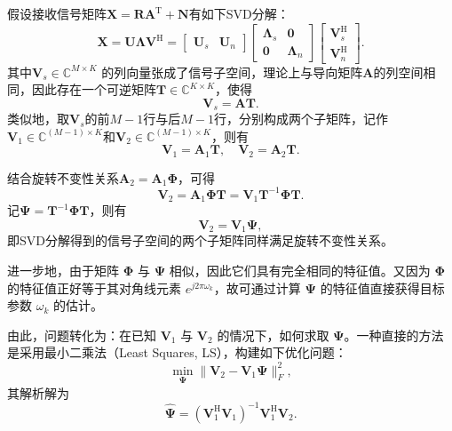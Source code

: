 假设接收信号矩阵\( \mathbf{X} = \mathbf{R} \mathbf{A}^{\mathrm{T}} + \mathbf{N} \)有如下SVD分解：
\[
    \mathbf{X} = \mathbf{U} \mathbf{\Lambda} \mathbf{V}^{\mathrm{H}} = \begin{bmatrix}
        \mathbf{U}_s & \mathbf{U}_n
    \end{bmatrix} \begin{bmatrix}
        \mathbf{\Lambda}_s & \mathbf{0}         \\
        \mathbf{0}         & \mathbf{\Lambda}_n
    \end{bmatrix} \begin{bmatrix}
        \mathbf{V}_s^{\mathrm{H}} \\
        \mathbf{V}_n^{\mathrm{H}}
    \end{bmatrix}.
\]
其中\( \mathbf{V}_s \in \mathbb{C}^{M \times K} \) 的列向量张成了信号子空间，理论上与导向矩阵\( \mathbf{A} \)的列空间相同，因此存在一个可逆矩阵\( \mathbf{T} \in \mathbb{C}^{K \times K} \)，使得
\[
    \mathbf{V}_s = \mathbf{A} \mathbf{T}.
\]
类似地，取\( \mathbf{V}_s \)的前\( M-1 \)行与后\( M-1 \)行，分别构成两个子矩阵，记作\( \mathbf{V}_1 \in \mathbb{C}^{(M-1) \times K} \)和\( \mathbf{V}_2 \in \mathbb{C}^{(M-1) \times K} \)，则有
\[
    \mathbf{V}_1 = \mathbf{A}_1 \mathbf{T}, \quad \mathbf{V}_2 = \mathbf{A}_2 \mathbf{T}.
\]

结合旋转不变性关系\( \mathbf{A}_2 = \mathbf{A}_1 \mathbf{\Phi} \)，可得
\[
    \mathbf{V}_2 = \mathbf{A}_1 \mathbf{\Phi} \mathbf{T} = \mathbf{V}_1 \mathbf{T}^{-1} \mathbf{\Phi} \mathbf{T}.
\]
记\( \mathbf{\Psi} = \mathbf{T}^{-1} \mathbf{\Phi} \mathbf{T} \)，则有
\[
    \mathbf{V}_2 = \mathbf{V}_1 \mathbf{\Psi},
\]
即SVD分解得到的信号子空间的两个子矩阵同样满足旋转不变性关系。

进一步地，由于矩阵 \( \mathbf{\Phi} \) 与 \( \mathbf{\Psi} \) 相似，因此它们具有完全相同的特征值。又因为 \( \mathbf{\Phi} \) 的特征值正好等于其对角线元素 \( e^{j2\pi\omega_k} \)，故可通过计算 \( \mathbf{\Psi} \) 的特征值直接获得目标参数 \( \omega_k \) 的估计。

由此，问题转化为：在已知 \( \mathbf{V}_1 \) 与 \( \mathbf{V}_2 \) 的情况下，如何求取 \( \mathbf{\Psi} \)。一种直接的方法是采用最小二乘法（Least Squares, LS），构建如下优化问题：
\[
    \min_{\mathbf{\Psi}} \|\mathbf{V}_2 - \mathbf{V}_1 \mathbf{\Psi}\|_F^2,
\]
其解析解为
\[
    \hat{\mathbf{\Psi}} = (\mathbf{V}_1^{\mathrm{H}} \mathbf{V}_1)^{-1} \mathbf{V}_1^{\mathrm{H}} \mathbf{V}_2.
\]

